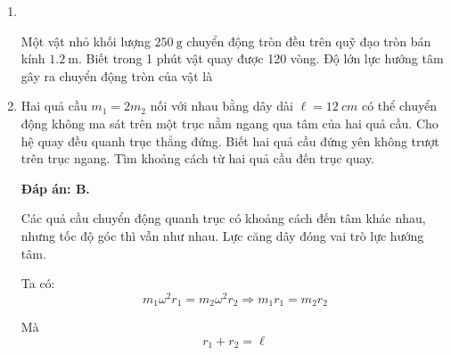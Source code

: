 \begin{enumerate}[label=\bfseries Câu \arabic*:]
\item {}\\
{Một vật nhỏ khối lượng $\SI{250}{\gram}$ chuyển động tròn đều trên quỹ đạo tròn bán kính $\SI{1.2}{\meter}$. Biết trong 1 phút vật quay được 120 vòng. Độ lớn lực hướng tâm gây ra chuyển động tròn của vật là
	\begin{mcq}(4)
		\item $\SI{47.3}{\newton}$.
		\item $\SI{3.8}{\newton}$.
		\item $\SI{4.5}{\newton}$.
		\item $\SI{46.4}{\newton}$.
	\end{mcq}

}

	\item {}
	
	
	{
		Hai quả cầu $m_1=2m_2$ nối với nhau bằng dây dài $\ell=\SI{12}{cm}$ có thể chuyển động không ma sát trên một trục nằm ngang qua tâm của hai quả cầu. Cho hệ quay đều quanh trục thẳng đứng. Biết hai quả cầu đứng yên không trượt trên trục ngang. Tìm khoảng cách từ hai quả cầu đến trục quay.
	}
	
	\hideall
	{	
		\textbf{Đáp án: B.}
		
		Các quả cầu chuyển động quanh trục có khoảng cách đến tâm khác nhau, nhưng tốc độ góc thì vẫn như nhau. Lực căng dây đóng vai trò lực hướng tâm.
		
		Ta có:
		$$m_1 \omega^2 r_1 = m_2 \omega^2 r_2 \Rightarrow m_1 r_1 = m_2 r_2$$
		
		Mà $$r_1+r_2 = \ell$$
		
}
\end{enumerate}
